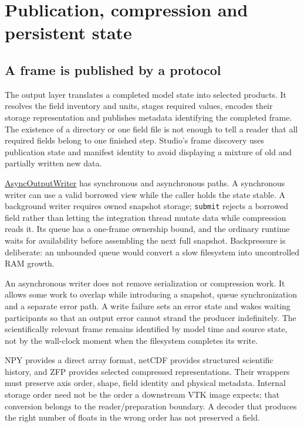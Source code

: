 \section{Publication, compression and persistent state}
\label{architecture-publication}

\subsection{A frame is published by a protocol}

The output layer translates a completed model state into selected products.
It resolves the field inventory and units, stages required values, encodes
their storage representation and publishes metadata identifying the completed
frame. The existence of a directory or one field file is not enough to tell
a reader that all required fields belong to one finished step. Studio's frame
discovery uses publication state and manifest identity to avoid displaying a
mixture of old and partially written new data.

\href{../src/core/output/output_writer.cpp}{AsyncOutputWriter} has synchronous
and asynchronous paths. A synchronous writer can use a valid borrowed view
while the caller holds the state stable. A background writer requires owned
snapshot storage; \texttt{submit} rejects a borrowed field rather than letting
the integration thread mutate data while compression reads it. Its queue has
a one-frame ownership bound, and the ordinary runtime waits for availability
before assembling the next full snapshot. Backpressure is deliberate: an
unbounded queue would convert a slow filesystem into uncontrolled RAM growth.

An asynchronous writer does not remove serialization or compression work. It
allows some work to overlap while introducing a snapshot, queue synchronization
and a separate error path. A write failure sets an error state and wakes waiting
participants so that an output error cannot strand the producer indefinitely.
The scientifically relevant frame remains identified by model time and source
state, not by the wall-clock moment when the filesystem completes its write.

NPY provides a direct array format, netCDF provides structured scientific
history, and ZFP provides selected compressed representations. Their wrappers
must preserve axis order, shape, field identity and physical metadata. Internal
storage order need not be the order a downstream VTK image expects; that
conversion belongs to the reader/preparation boundary. A decoder that produces
the right number of floats in the wrong order has not preserved a field.

